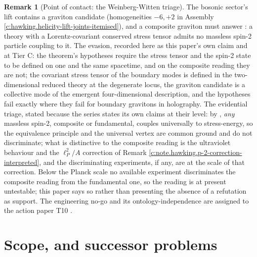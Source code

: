 \documentclass[11pt]{article}
\theoremstyle{definition}
\newtheorem{remark}[theorem]{Remark}
\theoremstyle{plain}
\begin{document}
\begin{remark}[Point of contact: the Weinberg-Witten triage]\label{c:note.hawking.point-contact-weinberg-witten-triage}
The bosonic sector's lift contains a graviton candidate (homogeneities $-6, +2$ in Assembly \ref{c:hawking.helicity-lift-joints-itemised}), and a composite graviton must answer \cite{WeinbergWitten1980}: a theory with a Lorentz-covariant conserved stress tensor admits no massless spin-2 particle coupling to it. The evasion, recorded here as this paper's own claim and at Tier C: the theorem's hypotheses require the stress tensor and the spin-2 state to be defined on one and the same spacetime, and on the composite reading they are not; the covariant stress tensor of the boundary modes is defined in the two-dimensional reduced theory at the degenerate locus, the graviton candidate is a collective mode of the emergent four-dimensional description, and the hypotheses fail exactly where they fail for boundary gravitons in holography. The evidential triage, stated because the series states its own claims at their level: by \cite{Weinberg1964}, \emph{any} massless spin-2, composite or fundamental, couples universally to stress-energy, so the equivalence principle and the universal vertex are common ground and do not discriminate; what is distinctive to the composite reading is the ultraviolet behaviour and the $\ell_P^2/A$ correction of Remark \ref{c:note.hawking.p-2-correction-interpreted}, and the discriminating experiments, if any, are at the scale of that correction. Below the Planck scale no available experiment discriminates the composite reading from the fundamental one, so the reading is at present untestable; this paper says so rather than presenting the absence of a refutation as support. The engineering no-go and its ontology-independence are assigned to the action paper T10 \cite{ButlerT10}.
\end{remark}

\section{Scope, and successor problems}
\end{document}
